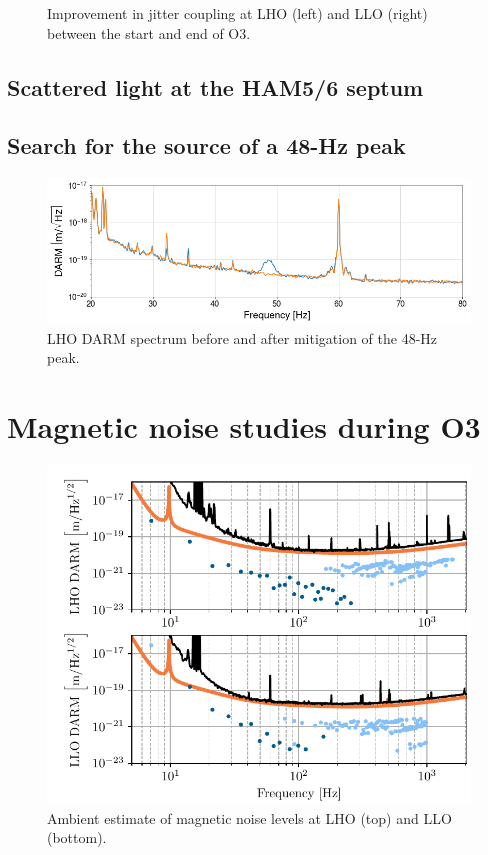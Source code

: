 \begin{figure}
	\centering
	\caption{Improvement in jitter coupling at LHO (left) and LLO (right) between the start and end of O3.}
	\label{fig:jitter}
\end{figure}

\subsection{Scattered light at the HAM5/6 septum}

\subsection{Search for the source of a 48-Hz peak}

\begin{figure}
	\centering
	\includegraphics[width=\textwidth]{figures/48Hz.png}
	\caption{LHO DARM spectrum before and after mitigation of the 48-Hz peak.}
	\label{fig:48hz}
\end{figure}

\section{Magnetic noise studies during O3}

\begin{figure}[h!]
	\centering
	\includegraphics[width=\textwidth]{figures/ambient_mag.pdf}
	\caption{
		Ambient estimate of magnetic noise levels at LHO (top) and LLO (bottom).}
	\label{fig:ambient-mag}
\end{figure}

